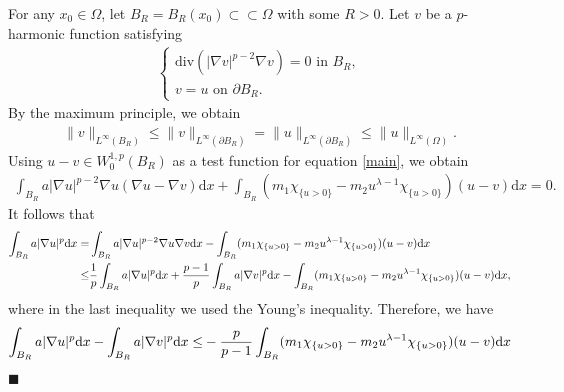 \documentclass[onecolumn]{autart}
\newenvironment{proof}{{\it Proof: \enspace}}{\hfill $\blacksquare$\par}
\begin{document}
	\begin{proof}
		For any $x_0\in \Omega$, let  $B_R = B_R(x_0)\subset\subset \Omega$ with some $ R>0$.  Let $v$ be a $p$-harmonic function satisfying
		\begin{align}\label{4.511}
			\begin{cases}
				\mathrm{div}\left(|\nabla v|^{p-2} \nabla v\right) = 0  \text{ in } B_{R}, \\
				v = u  \text{ on } \partial B_{R}.
			\end{cases}
		\end{align}
		By the maximum principle, we obtain
		\begin{align}
			\|v\|_{L^\infty(B_R)} \leq \|v\|_{L^\infty(\partial B_R)} = \|u\|_{L^\infty(\partial B_R)} \leq \|u\|_{L^\infty(\Omega)}. \label{Equ4.2}
		\end{align}
		Using $u-v\in W^{1,p}_0(B_R)$ as  a test  function for equation   \eqref{main}, we obtain
		\begin{align*}
			\int_{B_R}a|\nabla u|^{p-2}\nabla u (\nabla u -\nabla v)\mathrm{d}x + \int_{B_R} (m_1 \chi_{\{u>0\}} - m_2 u^{\lambda - 1} \chi_{\{u > 0\}}  )(u-v) \mathrm{d}x =0.
		\end{align*}
		It follows that
		\begin{align*}
			\int_{B_R}a|\nabla u|^{p } \mathrm{d}x=& \int_{B_R}a|\nabla u|^{p-2}\nabla u  \nabla v \mathrm{d}x -\int_{B_R} (m_1 \chi_{\{u>0\}} - m_2 u^{\lambda - 1} \chi_{\{u > 0\}}  )(u-v) \mathrm{d}x \notag\\
			\leq & \frac{1}{p}\int_{B_R}a|\nabla u|^{p }  \mathrm{d}x + \frac{p-1}{p}\int_{B_R}a|\nabla v|^{p }  \mathrm{d}x
			-\int_{B_R} (m_1 \chi_{\{u>0\}} - m_2 u^{\lambda - 1} \chi_{\{u > 0\}}  )(u-v) \mathrm{d}x,
		\end{align*}
		where in the last inequality we used the Young's inequality. Therefore, we have
		\begin{align}
			\int_{B_R}a|\nabla u|^{p } \mathrm{d}x -  \int_{B_R}a|\nabla v|^{p }  \mathrm{d}x %
			\leq &
			-\frac{p}{p-1}\int_{B_R} (m_1 \chi_{\{u>0\}} - m_2 u^{\lambda - 1} \chi_{\{u > 0\}}  )(u-v) \mathrm{d}x \notag\\

\end{align}
\end{proof}
\end{document}
